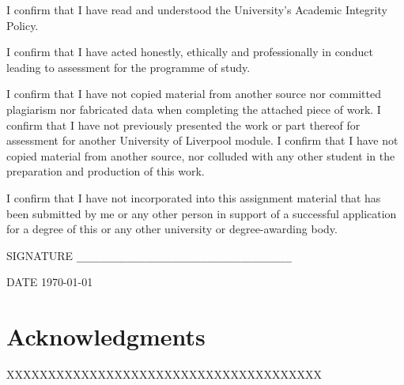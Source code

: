 \documentclass[twocolumn,11pt]{report}
\begin{document}
I confirm that I have read and understood the University's Academic Integrity Policy.

I confirm that I have acted honestly, ethically and professionally in conduct leading
to assessment for the programme of study.  

I confirm that I have not copied material from another source nor committed plagiarism
nor fabricated data when completing the attached piece of work.  I confirm that I have 
not previously presented the work or part thereof for assessment for another University
of Liverpool module.  I confirm that I have not copied material from another source, nor
colluded with any other student in the preparation and production of this work.  

I confirm that I have not incorporated into this assignment material that has been 
submitted by me or any other person in support of a successful application for a 
degree of this or any other university or degree-awarding body.  

\vspace*{1in}

\noindent SIGNATURE \verb!______________________________________!

\noindent DATE \hspace*{.4in}  \today

\vspace*{1in}




\newpage


\chapter*{\center Acknowledgments}

XXXXXXXXXXXXXXXXXXXXXXXXXXXXXXXXXXXXXX
\end{document}
